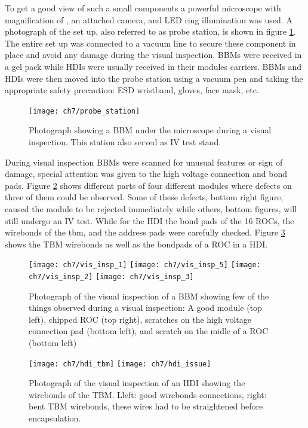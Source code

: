 To get a good view of such a small components a powerful microscope with magnification of {}, an attached camera, and LED ring illumination was used. A photograph of the set up, also referred to as probe station, is shown in figure \ref{fig:probe_station}. The entire set up was connected to a vacuum line to secure these component in place and avoid any damage during the visual inspection. BBMs were received in a gel pack while HDIs were usually received in their modules carriers. BBMs and HDIs were then moved into the probe station using a vacuum pen and taking the appropriate safety precaution: ESD wristband, gloves, face mask, etc.

\begin{figure}[!h]
	\centering
	\texttt{[image: ch7/probe\_station]}
	\caption[Photograph of the visual inspection and IV test station.]{Photograph showing a BBM under the microscope during a visual inspection. This station also served as IV test stand.}
	\label{fig:probe_station}
\end{figure}

During visual inspection BBMs were scanned for unusual features or sign of damage, special attention was given to the high voltage connection and bond pads. Figure \ref{fig:vis_insp_bbm} shows different parts of four different modules where defects on three of them could be observed. Some of these defects, bottom right figure, caused the module to be rejected immediately while others, bottom figures, will still undergo an IV test. While for the HDI the bond pads of the 16 ROCs, the wirebonds of the tbm, and the address pads were carefully checked. Figure \ref{fig:vis_insp_hdi} shows the TBM wirebonds as well as the bondpads of a ROC in a HDI.

\begin{figure}[!h]
	\centering
	\texttt{[image: ch7/vis\_insp\_1]}
	\texttt{[image: ch7/vis\_insp\_5]}
	\texttt{[image: ch7/vis\_insp\_2]}
	\texttt{[image: ch7/vis\_insp\_3]}
	\caption[Visual inspection of a bare module.]{Photograph of the visual inspection of a BBM showing few of the things observed during a visual inspection: A good module (top left), chipped ROC (top right), scratches on the high voltage connection pad (bottom left), and scratch on the midle of a ROC (bottom left)}
	\label{fig:vis_insp_bbm}
\end{figure}

\begin{figure}[!h]
	\centering
	\texttt{[image: ch7/hdi\_tbm]}
	\texttt{[image: ch7/hdi\_issue]}
	\caption[Visual inspection of a HDI.]{Photograph of the visual inspection of an HDI showing the wirebonds of the TBM. Lleft: good wirebonds connections, right: bent TBM wirebonds, these wires had to be straightened before encapsulation.}
	\label{fig:vis_insp_hdi}
\end{figure}


